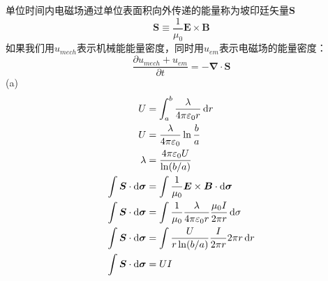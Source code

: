 单位时间内电磁场通过单位表面积向外传递的能量称为坡印廷矢量$\boldsymbol{S}$
\begin{equation}
    \boldsymbol{S}\equiv\frac{1}{\mu_0}\boldsymbol{E}\times\boldsymbol{B}
\end{equation}
如果我们用$u_{mech}$表示机械能能量密度，同时用$u_{em}$表示电磁场的能量密度：
\begin{equation}
    \frac{\partial u_{mech}+u_{em}}{\partial t}=-\boldsymbol{\nabla}\cdot\boldsymbol{S}
    \label{坡印廷_守恒定律}
\end{equation}
(a)
\begin{align*}
    U&=\int_{a}^{b}\frac{\lambda}{4\pi\varepsilon_0 r}\dif r\\
    U&=\frac{\lambda}{4\pi\varepsilon_0}\ln\frac{b}{a}\\
    \lambda&=\frac{4\pi\varepsilon_0U}{\ln(b/a)}\\
    \int\boldsymbol{S}\cdot\dif\boldsymbol\sigma&=\int\frac{1}{\mu_0}\boldsymbol{E}\times\boldsymbol{B}\cdot\dif\boldsymbol\sigma\\
    \int\boldsymbol{S}\cdot\dif\boldsymbol\sigma&=\int\frac{1}{\mu_0}\frac{\lambda}{4\pi\varepsilon_0 r}\frac{\mu_0I}{2\pi r}\dif\sigma\\
    \int\boldsymbol{S}\cdot\dif\boldsymbol\sigma&=\int\frac{U}{r\ln(b/a)}\frac{I}{2\pi r}2\pi r\dif r\\
    \int\boldsymbol{S}\cdot\dif\boldsymbol\sigma&=UI
\end{align*}

